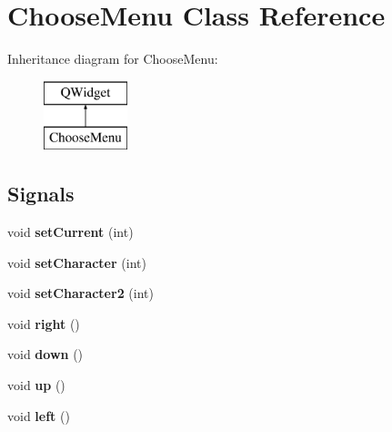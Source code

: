 \hypertarget{class_choose_menu}{}\section{Choose\+Menu Class Reference}
\label{class_choose_menu}
Inheritance diagram for Choose\+Menu\+:\begin{figure}[H]
\begin{center}
\leavevmode
\includegraphics[height=2.000000cm]{class_choose_menu}
\end{center}
\end{figure}
\subsection*{Signals}
\begin{DoxyCompactItemize}
\item 
\hypertarget{class_choose_menu_a053dc4e1fccc670fd57940a9143ba70e}{}void {\bfseries set\+Current} (int)\label{class_choose_menu_a053dc4e1fccc670fd57940a9143ba70e}

\item 
\hypertarget{class_choose_menu_a9ddf26dbd1f7e26d80978de6a881ee1b}{}void {\bfseries set\+Character} (int)\label{class_choose_menu_a9ddf26dbd1f7e26d80978de6a881ee1b}

\item 
\hypertarget{class_choose_menu_af8b98075fd4c7c50ad7417852e8ed226}{}void {\bfseries set\+Character2} (int)\label{class_choose_menu_af8b98075fd4c7c50ad7417852e8ed226}

\item 
\hypertarget{class_choose_menu_ab60b2705eb02edf89244d2f44debd3e7}{}void {\bfseries right} ()\label{class_choose_menu_ab60b2705eb02edf89244d2f44debd3e7}

\item 
\hypertarget{class_choose_menu_a667b64a72cbadf598af6eadd27d474de}{}void {\bfseries down} ()\label{class_choose_menu_a667b64a72cbadf598af6eadd27d474de}

\item 
\hypertarget{class_choose_menu_aab43a0cf8d120937626a34f24ba29342}{}void {\bfseries up} ()\label{class_choose_menu_aab43a0cf8d120937626a34f24ba29342}

\item 
\hypertarget{class_choose_menu_a583409f96522df4268a0d3441380b492}{}void {\bfseries left} ()\label{class_choose_menu_a583409f96522df4268a0d3441380b492}

\end{DoxyCompactItemize}
